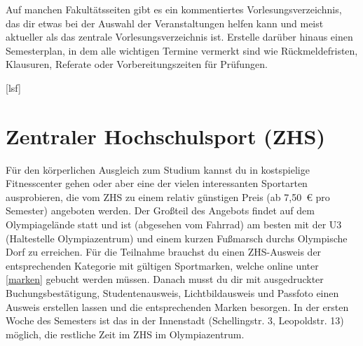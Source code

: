 Auf manchen Fakultätsseiten gibt es ein kommentiertes Vorlesungsverzeichnis, das dir etwas bei der Auswahl der Veranstaltungen helfen kann und meist aktueller als das zentrale Vorlesungsverzeichnis ist.
Erstelle darüber hinaus einen Semesterplan, in dem alle wichtigen Termine vermerkt sind wie Rückmeldefristen, Klausuren, Referate oder Vorbereitungszeiten für Prüfungen. %

\begin{urlList}
	[lsf]
\end{urlList}

	




\section{Zentraler Hochschulsport (ZHS)}

Für den körperlichen Ausgleich zum Studium kannst du in kostspielige
Fitnesscenter gehen oder aber eine der vielen interessanten Sportarten
ausprobieren, die vom ZHS zu einem relativ günstigen Preis (ab 7,50~€ pro
Semester) angeboten werden. Der Großteil des Angebots findet auf dem
Olympiagelände statt und ist (abgesehen vom Fahrrad) am besten mit der U3
(Haltestelle Olympiazentrum) und einem kurzen Fußmarsch durchs Olympische Dorf
zu erreichen. Für die Teilnahme brauchst du einen ZHS-Ausweis der
entsprechenden Kategorie mit gültigen Sportmarken, welche online unter
\ref{marken} gebucht werden müssen. Danach musst du dir mit ausgedruckter
Buchungsbestätigung, Studentenausweis, Lichtbildausweis und Passfoto einen
Ausweis erstellen lassen und die entsprechenden Marken besorgen. In der ersten
Woche des Semesters ist das in der Innenstadt (Schellingstr. 3, Leopoldstr. 13)
möglich, die restliche Zeit im ZHS im Olympiazentrum. 

